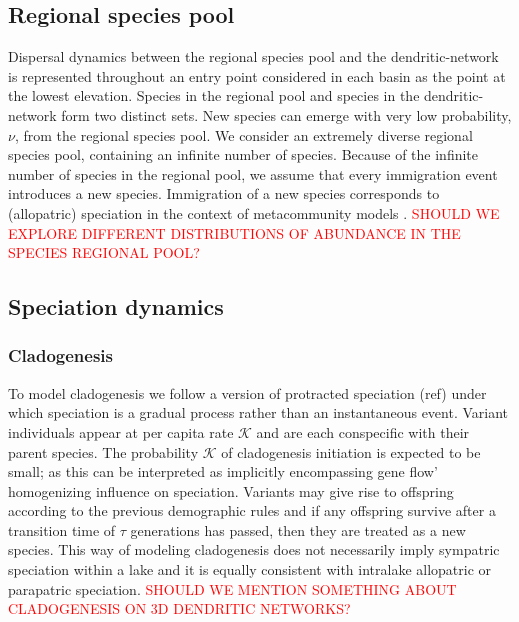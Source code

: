 \documentclass[11pt]{article}
\newcommand{\carlos}[1]{\textcolor{Red}{#1}}
\begin{document}
{\subsection{Regional species pool}

Dispersal dynamics between the regional species pool and the
dendritic-network is represented throughout an entry point considered
in each basin as the point at the lowest elevation. Species in the
regional pool and species in the dendritic-network form two distinct
sets. New species can emerge with very low probability, $\nu$, from
the regional species pool. We consider an extremely diverse regional
species pool, containing an infinite number of species. Because of the
infinite number of species in the regional pool, we assume that every
immigration event introduces a new species. Immigration of a new
species corresponds to (allopatric) speciation in the context of
metacommunity models \citep{Vanpeteghem&Haegeman:2010}. \carlos{SHOULD WE EXPLORE DIFFERENT DISTRIBUTIONS OF ABUNDANCE IN THE SPECIES
REGIONAL POOL?}



\subsection{Speciation dynamics}

\subsubsection{Cladogenesis}

To model cladogenesis we follow a version of protracted speciation
(ref) under which speciation is a gradual process rather than an
instantaneous event. Variant individuals appear at per capita rate
$\mathcal{K}$ and are each conspecific with their parent species. The
probability $\mathcal{K}$ of cladogenesis initiation is expected to be
small; as this can be interpreted as implicitly encompassing gene
flow' homogenizing influence on speciation. Variants may give rise to
offspring according to the previous demographic rules and if any
offspring survive after a transition time of $\tau$ generations has
passed, then they are treated as a new species. This way of modeling
cladogenesis does not necessarily imply sympatric speciation within a
lake and it is equally consistent with intralake allopatric or
parapatric speciation. \carlos{SHOULD WE MENTION SOMETHING ABOUT
  CLADOGENESIS ON 3D DENDRITIC NETWORKS?}

}
\end{document}

